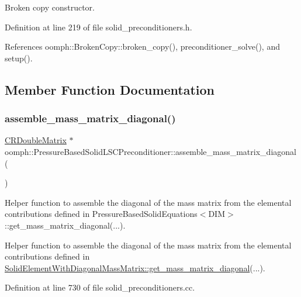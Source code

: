 Broken copy constructor. 



Definition at line 219 of file solid\+\_\+preconditioners.\+h.



References oomph\+::\+Broken\+Copy\+::broken\+\_\+copy(), preconditioner\+\_\+solve(), and setup().



\subsection{Member Function Documentation}
\mbox{\label{classoomph_1_1PressureBasedSolidLSCPreconditioner_a2b32d66080ccfb3a464245d16bea6168}} 
\subsubsection{\texorpdfstring{assemble\+\_\+mass\+\_\+matrix\+\_\+diagonal()}{assemble\_mass\_matrix\_diagonal()}}
{\footnotesize\ttfamily \hyperlink{classoomph_1_1CRDoubleMatrix}{C\+R\+Double\+Matrix} $\ast$ oomph\+::\+Pressure\+Based\+Solid\+L\+S\+C\+Preconditioner\+::assemble\+\_\+mass\+\_\+matrix\+\_\+diagonal (\begin{DoxyParamCaption}{ }\end{DoxyParamCaption})\hspace{0.3cm}{\ttfamily [private]}}

Helper function to assemble the diagonal of the mass matrix from the elemental contributions defined in Pressure\+Based\+Solid\+Equations$<$\+D\+I\+M$>$\+::get\+\_\+mass\+\_\+matrix\+\_\+diagonal(...).

Helper function to assemble the diagonal of the mass matrix from the elemental contributions defined in \hyperlink{classoomph_1_1SolidElementWithDiagonalMassMatrix_ad2335852a20987f6a6c8e0d6ce5bc3af}{Solid\+Element\+With\+Diagonal\+Mass\+Matrix\+::get\+\_\+mass\+\_\+matrix\+\_\+diagonal}(...). 

Definition at line 730 of file solid\+\_\+preconditioners.\+cc.



